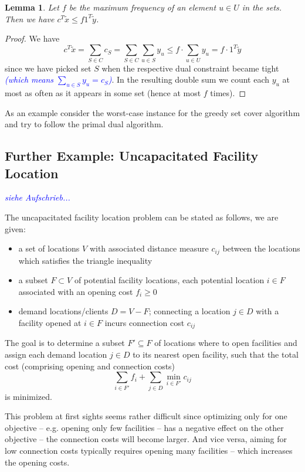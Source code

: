 \documentclass{article}
\newtheorem{lemma}{Lemma}
\begin{document}
\begin{lemma}
Let $f$ be the maximum frequency of an element $u\in U$ in the sets. Then we have 
$c^T\widetilde{x}\leq f 1^T\widetilde{y}$.
\end{lemma}
\begin{proof}
We have
\[
	c^T\widetilde{x} = \sum_{S\in C} c_S = \sum_{S\in C} \sum_{u\in S} y_u \leq f \cdot \sum_{u\in U} y_u = f \cdot 1^T \widetilde{y}
\]
since we have picked set $S$ when the respective dual constraint became tight \textcolor{blue}{\emph{(which means $\sum_{u \in S}{y_u} = c_S$)}}. In the resulting double sum we count each $y_u$ at most as often as it appears in some set (hence at most $f$ times).
\end{proof}

As an example consider the worst-case instance for the greedy set cover algorithm and try to follow the primal dual algorithm.

\subsection{Further Example: Uncapacitated Facility Location}

\textcolor{blue}{\emph{siehe Aufschrieb...}}

The uncapacitated facility location problem can be stated as follows, we are given:
\begin{itemize}
\item a set of locations $V$ with associated distance measure $c_{ij}$ between the locations which satisfies the triangle inequality
\item a subset $F\subset V$ of potential facility locations, each potential location $i\in F$ associated with an opening cost $f_i\geq 0$
\item demand locations/clients $D=V-F$; connecting a location $j\in D$ with a facility opened at $i\in F$ incurs connection cost $c_{ij}$ 
\end{itemize}

The goal is to determine a subset $F'\subseteq F$ of locations where to open facilities and assign each demand location $j\in D$ to its nearest open facility, such that the total cost (comprising opening and connection costs)
\[
	\sum_{i\in F'} f_i + \sum_{j\in D} \min_{i\in F'} c_{ij}
\] 
is minimized.

This problem at first sights seems rather difficult since optimizing only for one objective -- e.g. opening only few facilities -- has a negative effect on the other objective -- the connection costs will become larger. And vice versa, aiming for low connection costs typically requires opening many facilities -- which increases the opening costs.
\end{document}
